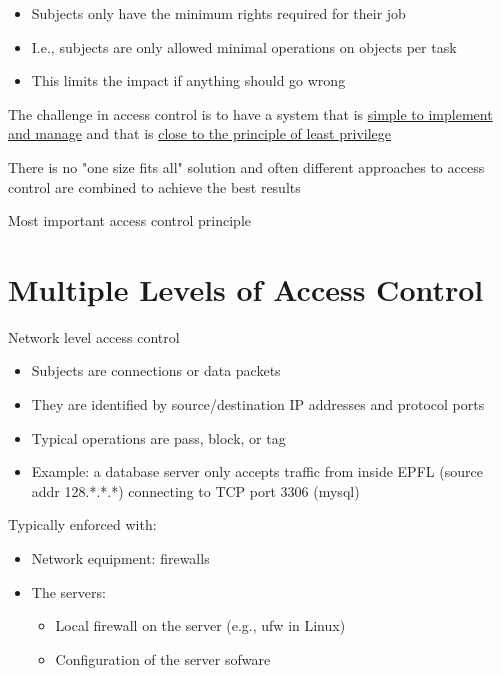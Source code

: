 \documentclass[11pt]{article}
\begin{document}
\begin{itemize}
	\item Subjects only have the minimum rights required for their job
	\item I.e., subjects are only allowed minimal operations on objects per task
	\item This limits the impact if anything should go wrong
\end{itemize}

The challenge in access control is to have a system that is \underline{simple to implement and manage} and that is \underline{close to the principle of least privilege}

There is no "one size fits all" solution and often different approaches to access control are combined to achieve the best results 

\begin{tcolorbox}[
  colback=green!15,     %
  colframe=black!50,    %
  boxrule=1pt,       %
  arc=3mm,             %
  left=4mm, right=4mm, top=2mm, bottom=2mm %
]
Most important access control principle
\end{tcolorbox}

\section*{Multiple Levels of Access Control}

Network level access control
\begin{itemize}
	\item Subjects are connections or data packets
	\item They are identified by source/destination IP addresses and protocol ports
	\item Typical operations are pass, block, or tag
	\item Example: a database server only accepts traffic from inside EPFL (source addr 128.*.*.*) connecting to TCP port 3306 (mysql)
\end{itemize}

Typically enforced with:
\begin{itemize}
	\item Network equipment: firewalls
	\item The servers:
		\begin{itemize}
			\item Local firewall on the server (e.g., ufw in Linux)
			\item Configuration of the server sofware
		\end{itemize}
\end{itemize}
\end{document}
